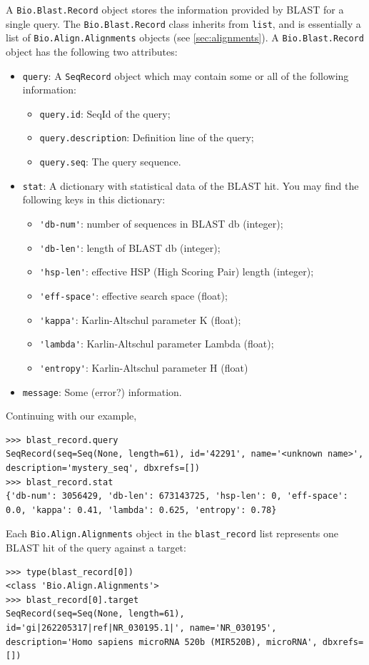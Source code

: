 A \verb|Bio.Blast.Record| object stores the information provided by BLAST for a single query. The \verb|Bio.Blast.Record| class inherits from \verb+list+, and is essentially a list of \verb|Bio.Align.Alignments| objects (see \ref{sec:alignments}). A \verb|Bio.Blast.Record| object has the following two attributes:
\begin{itemize}
\item \verb|query|:  A \verb|SeqRecord| object which may contain some or all of the following information:
\begin{itemize}
\item \verb|query.id|: SeqId of the query;
\item \verb|query.description|: Definition line of the query;
\item \verb|query.seq|: The query sequence.
\end{itemize}
\item \verb|stat|: A dictionary with statistical data of the BLAST hit. You may find the following keys in this dictionary:
\begin{itemize}
\item \verb|'db-num'|: number of sequences in BLAST db (integer);
\item \verb|'db-len'|: length of BLAST db (integer);
\item \verb|'hsp-len'|: effective HSP (High Scoring Pair) length (integer);
\item \verb|'eff-space'|: effective search space (float);
\item \verb|'kappa'|: Karlin-Altschul parameter K (float);
\item \verb|'lambda'|: Karlin-Altschul parameter Lambda (float);
\item \verb|'entropy'|: Karlin-Altschul parameter H (float)
\end{itemize}
\item \verb|message|: Some (error?) information.
\end{itemize}
Continuing with our example,
\begin{verbatim}
>>> blast_record.query
SeqRecord(seq=Seq(None, length=61), id='42291', name='<unknown name>', description='mystery_seq', dbxrefs=[])
>>> blast_record.stat
{'db-num': 3056429, 'db-len': 673143725, 'hsp-len': 0, 'eff-space': 0.0, 'kappa': 0.41, 'lambda': 0.625, 'entropy': 0.78}
\end{verbatim}
Each \verb|Bio.Align.Alignments| object in the \verb|blast_record| list represents one BLAST hit of the query against a target:
\begin{verbatim}
>>> type(blast_record[0])
<class 'Bio.Align.Alignments'>
>>> blast_record[0].target
SeqRecord(seq=Seq(None, length=61), id='gi|262205317|ref|NR_030195.1|', name='NR_030195', description='Homo sapiens microRNA 520b (MIR520B), microRNA', dbxrefs=[])
\end{verbatim}
